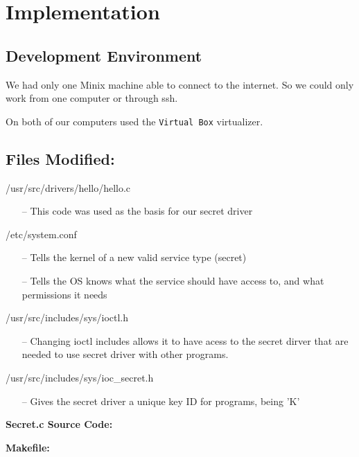 \documentclass[11pt]{article}
\begin{document}
\newpage 

\section{Implementation}
\begin{adjustwidth}{.2in}{}{

   \subsection{Development Environment}
   
      We had only one Minix machine able to connect to the internet. So we
         could only work from one computer or through ssh.

      On both of our computers used the {\tt Virtual Box} virtualizer.

   \subsection{Files Modified:}


      /usr/src/drivers/hello/hello.c
      \begin{itemize}
         \item[--] This code was used as the basis for our secret driver
      \end{itemize}
 

      /etc/system.conf
         \begin{itemize}
            \item[--] Tells the kernel of a new valid service type (secret)
            \item[--] Tells the OS knows what the service should have access to, and what permissions it needs
      \end{itemize}

      

      /usr/src/includes/sys/ioctl.h
      \begin{itemize}
         \item[--] Changing ioctl includes allows it to have acess to the secret dirver that are needed to use secret driver with other programs.
      \end{itemize}

      
      /usr/src/includes/sys/ioc\_secret.h
      \begin{itemize}
         \item[--] Gives the secret driver a unique key ID for programs, being 'K'
      \end{itemize}
      

   \newpage
   {\bf Secret.c Source Code:}
   \lstset{style=Cstyle}
    

   \bigskip

   {\bf Makefile:}
    

}\end{adjustwidth}
\end{document}
